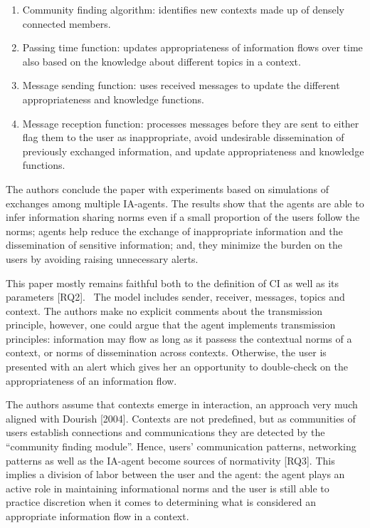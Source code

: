 \documentclass[../thesis.tex]{subfiles}
\newcommand\liststyleWWNumiii{%
\renewcommand\theenumi{\arabic{enumi}}
\renewcommand\theenumii{\alph{enumii}}
\renewcommand\theenumiii{\roman{enumiii}}
\renewcommand\theenumiv{\arabic{enumiv}}
\renewcommand\labelenumi{\theenumi.}
\renewcommand\labelenumii{\theenumii.}
\renewcommand\labelenumiii{\theenumiii.}
\renewcommand\labelenumiv{\theenumiv.}
}
\begin{document}
\liststyleWWNumiii
\begin{enumerate}
\item Community finding algorithm: identifies new contexts made up of
densely connected members.
\item Passing time function: updates appropriateness of information
flows over time also based on the knowledge about different topics in a
context.
\item Message sending function: uses received messages to update the
different appropriateness and knowledge functions.
\item Message reception function: processes messages before they are
sent to either flag them to the user as inappropriate, avoid
undesirable dissemination of previously exchanged information, and
update appropriateness and knowledge functions.
\end{enumerate}
The authors conclude the paper with experiments based on simulations of
exchanges among multiple IA-agents. The results show that the agents
are able to infer information sharing norms even if a small proportion
of the users follow the norms; agents help reduce the exchange of
inappropriate information and the dissemination of sensitive
information; and, they minimize the burden on the users by avoiding
raising unnecessary alerts.

This paper mostly remains faithful both to the definition of CI as well
as its parameters [RQ2]. \ The model includes sender, receiver,
messages, topics and context. The authors make no explicit comments
about the transmission principle, however, one could argue that the
agent implements transmission principles: information may flow as long
as it passess the contextual norms of a context, or norms of
dissemination across contexts. Otherwise, the user is presented with an
alert which gives her an opportunity to double-check on the
appropriateness of an information flow.

The authors assume that contexts emerge in interaction, an approach very
much aligned with Dourish [2004]. Contexts are not predefined, but as
communities of users establish connections and communications they are
detected by the ``community finding
module''. Hence, users' communication
patterns, networking patterns as well as the IA-agent become sources of
normativity [RQ3]. This implies a division of labor between the user
and the agent: the agent plays an active role in maintaining
informational norms and the user is still able to practice discretion
when it comes to determining what is considered an appropriate
information flow in a context.
\end{document}
